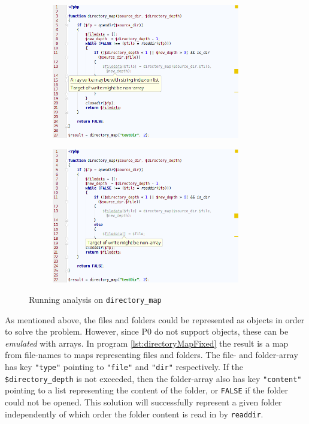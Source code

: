 \begin{figure}
\centering
\begin{subfigure}{\textwidth}
\centering
\includegraphics[width=0.9\textwidth]{chapters/caseStudy/screens/dir1}
\label{fig:directoryScreenshot1}

\end{subfigure}
\begin{subfigure}{\textwidth}
\centering
\includegraphics[width=0.9\textwidth]{chapters/caseStudy/screens/dir2}
\label{fig:directoryScreenshot2}

\end{subfigure}
\caption{Running analysis on \texttt{directory\_map}}
\label{fig:directoryScreenshot}
\end{figure}

As mentioned above, the files and folders could be represented as objects in order to solve the problem. However, since P0 do not support objects, these can be \textit{emulated} with arrays. In program \ref{lst:directoryMapFixed} the result is a map from file-names to maps representing files and folders. The file- and folder-array has key \texttt{"type"} pointing to \texttt{"file"} and \texttt{"dir"} respectively. If the \texttt{\$directory\_depth} is not exceeded, then the folder-array also has key \texttt{"content"} pointing to a list representing the content of the folder, or \texttt{FALSE} if the folder could not be opened.  This solution will successfully represent a given folder independently of which order the folder content is read in by \texttt{readdir}.


